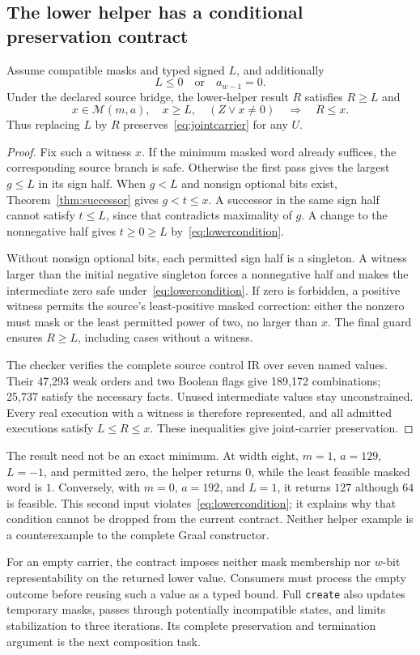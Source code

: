 \subsection{The lower helper has a conditional preservation contract}
\begin{theorem}\label{thm:lower}
Assume compatible masks and typed signed $L$, and additionally
\begin{equation}\label{eq:lowercondition}
 L\le0\quad\text{or}\quad a_{w-1}=0.
\end{equation}
Under the declared source bridge, the lower-helper result $R$ satisfies $R\ge L$ and
\[
 x\in\mathcal M(m,a),\quad x\ge L,\quad (Z\lor x\ne0)
 \quad\Longrightarrow\quad R\le x.
\]
Thus replacing $L$ by $R$ preserves~\eqref{eq:jointcarrier} for any $U$.
\end{theorem}
\begin{proof}
Fix such a witness $x$. If the minimum masked word already suffices, the corresponding source branch is safe. Otherwise the first pass gives the largest $g\le L$ in its sign half. When $g<L$ and nonsign optional bits exist, Theorem~\ref{thm:successor} gives $g<t\le x$. A successor in the same sign half cannot satisfy $t\le L$, since that contradicts maximality of $g$. A change to the nonnegative half gives $t\ge0\ge L$ by~\eqref{eq:lowercondition}.

Without nonsign optional bits, each permitted sign half is a singleton. A witness larger than the initial negative singleton forces a nonnegative half and makes the intermediate zero safe under~\eqref{eq:lowercondition}. If zero is forbidden, a positive witness permits the source's least-positive masked correction: either the nonzero must mask or the least permitted power of two, no larger than $x$. The final guard ensures $R\ge L$, including cases without a witness.

The checker verifies the complete source control IR over seven named values. Their 47,293 weak orders and two Boolean flags give 189,172 combinations; 25,737 satisfy the necessary facts. Unused intermediate values stay unconstrained. Every real execution with a witness is therefore represented, and all admitted executions satisfy $L\le R\le x$. These inequalities give joint-carrier preservation.
\end{proof}

The result need not be an exact minimum. At width eight, $m=1$, $a=129$, $L=-1$, and permitted zero, the helper returns $0$, while the least feasible masked word is $1$. Conversely, with $m=0$, $a=192$, and $L=1$, it returns $127$ although $64$ is feasible. This second input violates~\eqref{eq:lowercondition}; it explains why that condition cannot be dropped from the current contract. Neither helper example is a counterexample to the complete Graal constructor.

For an empty carrier, the contract imposes neither mask membership nor $w$-bit representability on the returned lower value. Consumers must process the empty outcome before reusing such a value as a typed bound. Full \texttt{create} also updates temporary masks, passes through potentially incompatible states, and limits stabilization to three iterations. Its complete preservation and termination argument is the next composition task.
